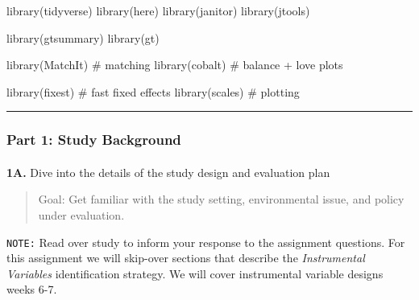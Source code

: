 \documentclass[
  letterpaper,
  DIV=11,
  numbers=noendperiod]{scrartcl}
\makeatletter
\let\oldparagraph\paragraph
\renewcommand{\paragraph}{
    \@ifstar
      \xxxParagraphStar
      \xxxParagraphNoStar
  }
\newcommand{\xxxParagraphStar}[1]{\oldparagraph*{#1}\mbox{}}
\newcommand{\xxxParagraphNoStar}[1]{\oldparagraph{#1}\mbox{}}
\newenvironment{Shaded}{\begin{snugshade}}{\end{snugshade}}
\newcommand{\CommentTok}[1]{\textcolor[rgb]{0.37,0.37,0.37}{#1}}
\newcommand{\FunctionTok}[1]{\textcolor[rgb]{0.28,0.35,0.67}{#1}}
\newcommand{\NormalTok}[1]{\textcolor[rgb]{0.00,0.23,0.31}{#1}}
\makeatother
\begin{document}
\begin{Shaded}
\begin{Highlighting}[]
\FunctionTok{library}\NormalTok{(tidyverse)}
\FunctionTok{library}\NormalTok{(here)}
\FunctionTok{library}\NormalTok{(janitor)}
\FunctionTok{library}\NormalTok{(jtools)}

\FunctionTok{library}\NormalTok{(gtsummary)}
\FunctionTok{library}\NormalTok{(gt)}

\FunctionTok{library}\NormalTok{(MatchIt) }\CommentTok{\# matching}
\FunctionTok{library}\NormalTok{(cobalt)  }\CommentTok{\# balance + love plots}

\FunctionTok{library}\NormalTok{(fixest) }\CommentTok{\# fast fixed effects}
\FunctionTok{library}\NormalTok{(scales) }\CommentTok{\# plotting}
\end{Highlighting}
\end{Shaded}

\begin{center}\rule{0.5\linewidth}{0.5pt}\end{center}

\subsubsection{Part 1: Study Background}\label{part-1-study-background}

\paragraph{\texorpdfstring{\textbf{1A.} Dive into the details of the
study design and evaluation
plan}{1A. Dive into the details of the study design and evaluation plan}}\label{a.-dive-into-the-details-of-the-study-design-and-evaluation-plan}

\begin{quote}
Goal: Get familiar with the study setting, environmental issue, and
policy under evaluation.
\end{quote}

\begin{tcolorbox}[enhanced jigsaw, colback=white, breakable, rightrule=.15mm, leftrule=.75mm, colframe=quarto-callout-color-frame, opacityback=0, arc=.35mm, bottomrule=.15mm, toprule=.15mm, left=2mm]

\texttt{NOTE:} Read over study to inform your response to the assignment
questions. For this assignment we will skip-over sections that describe
the \emph{Instrumental Variables} identification strategy. We will cover
instrumental variable designs weeks 6-7.

\end{tcolorbox}
\end{document}

